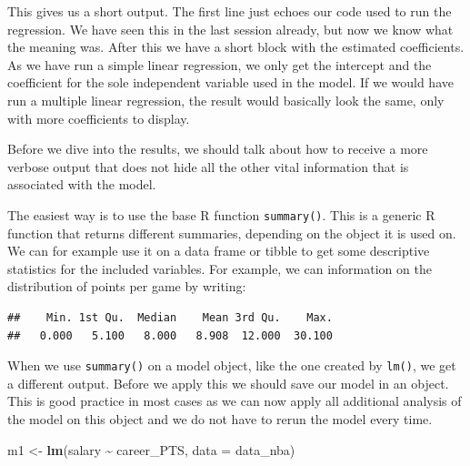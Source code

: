 \documentclass[
]{book}
\newenvironment{Shaded}{\begin{snugshade}}{\end{snugshade}}
\newcommand{\AttributeTok}[1]{\textcolor[rgb]{0.13,0.29,0.53}{#1}}
\newcommand{\FunctionTok}[1]{\textcolor[rgb]{0.13,0.29,0.53}{\textbf{#1}}}
\newcommand{\NormalTok}[1]{#1}
\newcommand{\OtherTok}[1]{\textcolor[rgb]{0.56,0.35,0.01}{#1}}
\newcommand{\SpecialCharTok}[1]{\textcolor[rgb]{0.81,0.36,0.00}{\textbf{#1}}}
\begin{document}
This gives us a short output. The first line just echoes our code used to run
the regression. We have seen this in the last session already, but now we know
what the meaning was. After this we have a short block with the estimated
coefficients. As we have run a simple linear regression, we only get the
intercept and the coefficient for the sole independent variable used in the
model. If we would have run a multiple linear regression, the result would
basically look the same, only with more coefficients to display.

Before we dive into the results, we should talk about how to receive a more
verbose output that does not hide all the other vital information that is
associated with the model.

The easiest way is to use the base R function \texttt{summary()}. This is a generic R
function that returns different summaries, depending on the object it is used
on. We can for example use it on a data frame or tibble to get some descriptive
statistics for the included variables. For example, we can information on the
distribution of points per game by writing:

\begin{Shaded}
\end{Shaded}

\begin{verbatim}
##    Min. 1st Qu.  Median    Mean 3rd Qu.    Max. 
##   0.000   5.100   8.000   8.908  12.000  30.100
\end{verbatim}

When we use \texttt{summary()} on a model object, like the one created by \texttt{lm()}, we
get a different output. Before we apply this we should save our model in an
object. This is good practice in most cases as we can now apply all additional
analysis of the model on this object and we do not have to rerun the model
every time.

\begin{Shaded}
\begin{Highlighting}[]
\NormalTok{m1 }\OtherTok{\textless{}{-}} \FunctionTok{lm}\NormalTok{(salary }\SpecialCharTok{\textasciitilde{}}\NormalTok{ career\_PTS, }\AttributeTok{data =}\NormalTok{ data\_nba)}
\end{Highlighting}
\end{Shaded}
\end{document}
